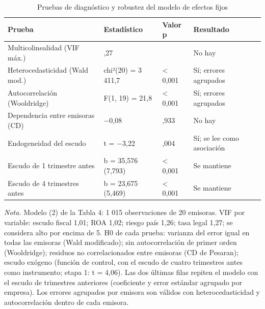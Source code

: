 \begin{table}[htbp]
\centering
\small
\setlength{\tabcolsep}{4pt}
\caption{Pruebas de diagnóstico y robustez del modelo de efectos fijos}
\label{tab:tabla6_diagnostico}
\begin{tabular}{l>{\centering\arraybackslash}p{2.7cm}>{\centering\arraybackslash}p{2.7cm}>{\centering\arraybackslash}p{2.7cm}}
\toprule
Prueba & Estadístico & Valor p & Resultado \\
\midrule
Multicolinealidad (VIF máx.) & 1,27 &  & No hay \\
Heterocedasticidad (Wald mod.) & chi²(20) = 3 411,7 & < 0,001 & Sí; errores agrupados \\
Autocorrelación (Wooldridge) & F(1, 19) = 21,8 & < 0,001 & Sí; errores agrupados \\
Dependencia entre emisoras (CD) & $-$0,08 & 0,933 & No hay \\
Endogeneidad del escudo & t = $-$3,22 & 0,004 & Sí; se lee como asociación \\
Escudo de 1 trimestre antes & b = 35,576 (7,793) & < 0,001 & Se mantiene \\
Escudo de 4 trimestres antes & b = 23,675 (5,469) & < 0,001 & Se mantiene \\
\bottomrule
\end{tabular}
\par\vspace{2pt}\footnotesize\raggedright \textit{Nota.} Modelo (2) de la Tabla 4: 1 015 observaciones de 20 emisoras. VIF por variable: escudo fiscal 1,01; ROA 1,02; riesgo país 1,26; tasa legal 1,27; se considera alto por encima de 5. H0 de cada prueba: varianza del error igual en todas las emisoras (Wald modificado); sin autocorrelación de primer orden (Wooldridge); residuos no correlacionados entre emisoras (CD de Pesaran); escudo exógeno (función de control, con el escudo de cuatro trimestres antes como instrumento; etapa 1: t = 4,06). Las dos últimas filas repiten el modelo con el escudo de trimestres anteriores (coeficiente y error estándar agrupado por empresa). Los errores agrupados por emisora son válidos con heterocedasticidad y autocorrelación dentro de cada emisora.
\end{table}

